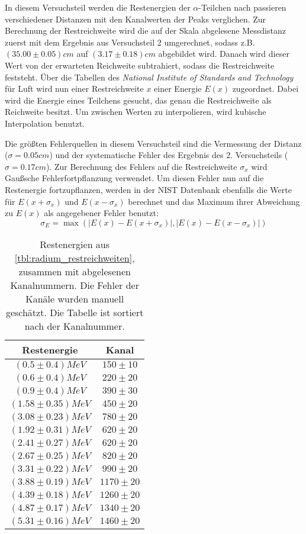 \documentclass{../Misc/MontavonLaTeX/Montavon}
\begin{document}
In diesem Versuchsteil werden die Restenergien der $\alpha$-Teilchen nach passieren verschiedener Distanzen mit den Kanalwerten der Peaks verglichen. 
Zur Berechnung der Restreichweite wird die auf der Skala abgelesene Messdistanz zuerst mit dem Ergebnis aus Versuchsteil 2 umgerechnet, sodass z.B. $(35.00 \pm 0.05) \unit{cm}$ auf $(3.17 \pm 0.18) \unit{cm}$ abgebildet wird. Danach wird dieser Wert von der erwarteten Reichweite subtrahiert, sodass die Restreichweite feststeht. Über die Tabellen des \emph{National Institute of Standards and Technology} für Luft \cite{nist_alpha} wird nun einer Restreichweite $x$ einer Energie $E(x)$ zugeordnet. Dabei wird die Energie eines Teilchens gesucht, das genau die Restreichweite als Reichweite besitzt. Um zwischen Werten zu interpolieren, wird kubische Interpolation benutzt. 

Die größten Fehlerquellen in diesem Versuchsteil sind die Vermessung der Distanz ($\sigma = 0.05 \unit{cm}$) und der systematische Fehler des Ergebnis des 2. Versuchsteils ($\sigma = 0.17 \unit{cm}$). Zur Berechnung des Fehlers auf die Restreichweite $\sigma_x$ wird Gaußsche Fehlerfortpflanzung verwendet. Um diesen Fehler nun auf die Restenergie fortzupflanzen, werden in der NIST Datenbank ebenfalls die Werte für $E(x+\sigma_x)$ und $E(x-\sigma_x)$ berechnet und das Maximum ihrer Abweichung zu $E(x)$ als angegebener Fehler benutzt:
\[
	\sigma_E = \max\left(|E(x)-E(x+\sigma_x)|, |E(x)-E(x-\sigma_x)|\right)
\]


\begin{table}[htbp]
\centering
\begin{tabular}{|c|c|}
\hline
Restenergie & Kanal \\
\hline
$(0.5 \pm 0.4) \unit{MeV}$ & $150 \pm 10$ \\
$(0.6 \pm 0.4) \unit{MeV}$ & $220 \pm 20$ \\
$(0.9 \pm 0.4) \unit{MeV}$ & $390 \pm 30$ \\
$(1.58 \pm 0.35) \unit{MeV}$ & $450 \pm 20$ \\
$(3.08 \pm 0.23) \unit{MeV}$ & $780 \pm 20$ \\
$(1.92 \pm 0.31) \unit{MeV}$ & $620 \pm 20$ \\
$(2.41 \pm 0.27) \unit{MeV}$ & $620 \pm 20$ \\
$(2.67 \pm 0.25) \unit{MeV}$ & $820 \pm 20$ \\
$(3.31 \pm 0.22) \unit{MeV}$ & $990 \pm 20$ \\
$(3.88 \pm 0.19) \unit{MeV}$ & $1170 \pm 20$ \\
$(4.39 \pm 0.18) \unit{MeV}$ & $1260 \pm 20$ \\
$(4.87 \pm 0.17) \unit{MeV}$ & $1340 \pm 20$ \\
$(5.31 \pm 0.16) \unit{MeV}$ & $1460 \pm 20$ \\
\hline
\end{tabular}
\caption{Restenergien aus \ref{tbl:radium_restreichweiten}, zusammen mit abgelesenen Kanalnummern. Die Fehler der Kanäle wurden manuell geschätzt. Die Tabelle ist sortiert nach der Kanalnummer.}
\label{tbl:radium_restreichweiten_fit}
\end{table}
\end{document}
